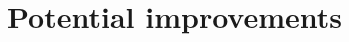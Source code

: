 \documentclass[11pt]{scrartcl} %
\begin{document}
\section{Potential improvements}
\label{Potential improvements}









\printbibliography
\end{document}
